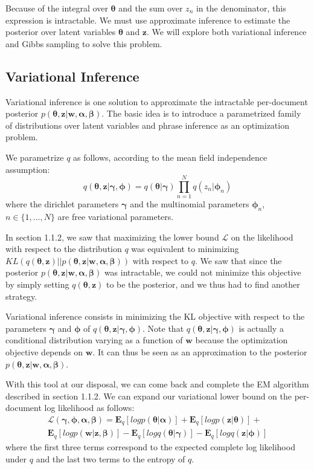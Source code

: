 \documentclass{article}
\begin{document}
Because of the integral over $\bm{\theta}$ and the sum over $z_n$ in the denominator, this expression is intractable. We must use approximate inference to estimate the posterior over latent variables $\bm{\theta}$ and $\mathbf{z}$. We will explore both variational inference and Gibbs sampling to solve this problem.

\subsection{Variational Inference}
Variational inference is one solution to approximate the intractable per-document posterior $p(\bm{\theta}, \mathbf{z} | \mathbf{w}, \bm{\alpha}, \bm{\beta})$. The basic idea is to introduce a parametrized family of distributions over latent variables and phrase inference as an optimization problem. 

We parametrize $q$ as follows, according to the mean field independence assumption:
\begin{equation}
q(\bm{\theta}, \mathbf{z} | \bm{\gamma}, \bm{\phi}) =
q(\bm{\theta} | \bm{\gamma}) \prod_{n=1}^N q(z_n | \bm{\phi}_n)
\end{equation}
where the dirichlet parameters $\bm{\gamma}$ and the multinomial parameters $\bm{\phi}_n$, $n \in \{1,...,N\}$ are free variational parameters. 

In section 1.1.2, we saw that maximizing the lower bound $\mathcal{L}$ on the likelihood with respect to the distribution $q$ was equivalent to minimizing $KL(q(\bm{\theta}, \mathbf{z}) || p(\bm{\theta}, \mathbf{z} | \mathbf{w}, \bm{\alpha}, \bm{\beta}))$ with respect to $q$. We saw that since the posterior $p(\bm{\theta}, \mathbf{z} | \mathbf{w}, \bm{\alpha}, \bm{\beta})$ was intractable, we could not minimize this objective by simply setting $q(\bm{\theta}, \mathbf{z})$ to be the posterior, and we thus had to find another strategy. 

Variational inference consists in minimizing the KL objective with respect to the parameters $\bm{\gamma}$ and $\bm{\phi}$ of $q(\bm{\theta}, \mathbf{z} | \bm{\gamma}, \bm{\phi})$. Note that $q(\bm{\theta}, \mathbf{z} | \bm{\gamma}, \bm{\phi})$ is actually a conditional distribution varying as a function of $\mathbf{w}$ because the optimization objective depends on $\mathbf{w}$. It can thus be seen as an approximation to the posterior $p(\bm{\theta}, \mathbf{z} | \mathbf{w}, \bm{\alpha}, \bm{\beta})$.

With this tool at our disposal, we can come back and complete the EM algorithm described in section 1.1.2. We can expand our variational lower bound on the per-document log likelihood as follows:
\begin{multline}
\mathcal{L}(\bm{\gamma}, \bm{\phi},\bm{\alpha}, \bm{\beta}) = 
\mathbf{E}_q [log p(\bm{\theta} | \bm{\alpha})] + 
\mathbf{E}_q [log p(\mathbf{z} | \bm{\theta})] + \\
\mathbf{E}_q [log p(\mathbf{w} | \mathbf{z}, \bm{\beta})] -
\mathbf{E}_q [log q(\bm{\theta} | \bm{\gamma})] -
\mathbf{E}_q [log q(\mathbf{z} | \bm{\phi})]
\end{multline}
where the first three terms correspond to the expected complete log likelihood under $q$ and the last two terms to the entropy of $q$.
\end{document}
